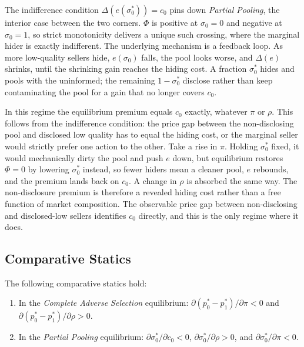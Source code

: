 The indifference condition $\Delta(e(\sigma_0^*))=c_0$ pins down \emph{Partial Pooling}, the interior case between the two corners. $\Phi$ is positive at $\sigma_0=0$ and negative at $\sigma_0=1$, so strict monotonicity delivers a unique such crossing, where the marginal hider is exactly indifferent. The underlying mechanism is a feedback loop. As more low-quality sellers hide, $e(\sigma_0)$ falls, the pool looks worse, and $\Delta(e)$ shrinks, until the shrinking gain reaches the hiding cost. A fraction $\sigma_0^*$ hides and pools with the uninformed; the remaining $1-\sigma_0^*$ disclose rather than keep contaminating the pool for a gain that no longer covers $c_0$.

In this regime the equilibrium premium equals $c_0$ exactly, whatever $\pi$ or $\rho$. This follows from the indifference condition: the price gap between the non-disclosing pool and disclosed low quality has to equal the hiding cost, or the marginal seller would strictly prefer one action to the other. Take a rise in $\pi$. Holding $\sigma_0^*$ fixed, it would mechanically dirty the pool and push $e$ down, but equilibrium restores $\Phi=0$ by lowering $\sigma_0^*$ instead, so fewer hiders mean a cleaner pool, $e$ rebounds, and the premium lands back on $c_0$. A change in $\rho$ is absorbed the same way. The non-disclosure premium is therefore a revealed hiding cost rather than a free function of market composition. The observable price gap between non-disclosing and disclosed-low sellers identifies $c_0$ directly, and this is the only regime where it does.

\subsection{Comparative Statics}

\begin{proposition}
\label{prop:comparative_statics}
The following comparative statics hold:
\begin{enumerate}[label=(\roman*)]
    \item In the \emph{Complete Adverse Selection} equilibrium: $\partial(p_0^*-p_1^*)/\partial\pi < 0$ and $\partial(p_0^*-p_1^*)/\partial\rho > 0$.
    \item In the \emph{Partial Pooling} equilibrium: $\partial\sigma_0^*/\partial c_0 < 0$, $\partial\sigma_0^*/\partial\rho > 0$, and $\partial\sigma_0^*/\partial\pi < 0$.
\end{enumerate}
\end{proposition}

